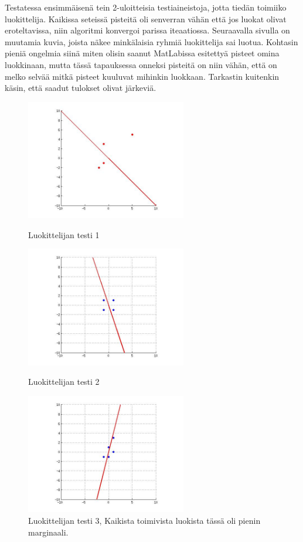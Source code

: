 \documentclass[a4paper,10pt]{article}
\begin{document}
Testatessa ensimmäisenä tein 2-uloitteisia testiaineistoja, jotta tiedän toimiiko luokittelija. Kaikissa seteissä pisteitä oli senverran vähän että jos 
luokat olivat eroteltavissa, niin algoritmi konvergoi parissa iteaatiossa. Seuraavalla sivulla on muutamia kuvia, joista näkee minkälaisia 
ryhmiä luokittelija sai luotua. Kohtasin pieniä ongelmia siinä miten olisin saanut MatLabissa esitettyä pisteet omina luokkinaan, mutta 
tässä tapauksessa onneksi pisteitä on niin vähän, että on melko selvää mitkä pisteet kuuluvat mihinkin luokkaan. Tarkastin kuitenkin käsin, että 
saadut tulokset olivat järkeviä.
\begin{figure}[ht!]

\includegraphics[width=70mm]{sanityCheck1.jpg}
\caption{Luokittelijan testi 1}


\includegraphics[width=70mm]{sanityCheck2.jpg}
\caption{Luokittelijan testi 2}

\includegraphics[width=70mm]{sanityCheck3.jpg}
\caption{Luokittelijan testi 3, Kaikista toimivista luokista tässä oli pienin marginaali.}


\end{figure}
\end{document}

